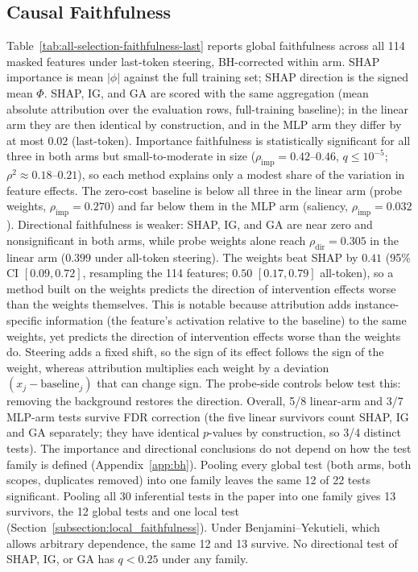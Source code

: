 \subsection{Causal Faithfulness}
Table~\ref{tab:all-selection-faithfulness-last} reports global faithfulness across all 114 masked features under last-token steering, BH-corrected within arm. SHAP importance is mean $|\phi|$ against the full training set; SHAP direction is the signed mean $\Phi$. SHAP, IG, and GA are scored with the same aggregation (mean absolute attribution over the evaluation rows, full-training baseline); in the linear arm they are then identical by construction, and in the MLP arm they differ by at most $0.02$ (last-token). Importance faithfulness is statistically significant for all three in both arms but small-to-moderate in size ($\rho_{\text{imp}} = 0.42$--$0.46$, $q \le 10^{-5}$; $\rho^2\approx0.18$--$0.21$), so each method explains only a modest share of the variation in feature effects. The zero-cost baseline is below all three in the linear arm (probe weights, $\rho_{\text{imp}} = 0.270$) and far below them in the MLP arm (saliency, $\rho_{\text{imp}} = 0.032$). Directional faithfulness is weaker: SHAP, IG, and GA are near zero and nonsignificant in both arms, while probe weights alone reach $\rho_{\text{dir}} = 0.305$ in the linear arm ($0.399$ under all-token steering). The weights beat SHAP by $0.41$ (95\% CI $[0.09,0.72]$, resampling the 114 features; $0.50$ $[0.17,0.79]$ all-token), so a method built on the weights predicts the direction of intervention effects worse than the weights themselves. This is notable because attribution adds instance-specific information (the feature’s activation relative to the baseline) to the same weights, yet predicts the direction of intervention effects worse than the weights do. Steering adds a fixed shift, so the sign of its effect follows the sign of the weight, whereas attribution multiplies each weight by a deviation $(x_j - \text{baseline}_j)$ that can change sign. The probe-side controls below test this: removing the background restores the direction. Overall, 5/8 linear-arm and 3/7 MLP-arm tests survive FDR correction (the five linear survivors count SHAP, IG and GA separately; they have identical $p$-values by construction, so 3/4 distinct tests). The importance and directional conclusions do not depend on how the test family is defined (Appendix~\ref{app:bh}). Pooling every global test (both arms, both scopes, duplicates removed) into one family leaves the same 12 of 22 tests significant. Pooling all 30 inferential tests in the paper into one family gives 13 survivors, the 12 global tests and one local test (Section~\ref{subsection:local_faithfulness}). Under Benjamini--Yekutieli, which allows arbitrary dependence, the same 12 and 13 survive. No directional test of SHAP, IG, or GA has $q<0.25$ under any family.
